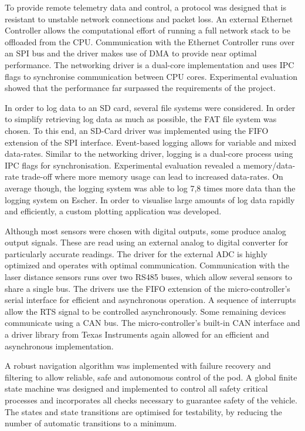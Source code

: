 
To provide remote telemetry data and control, a protocol was designed that is resistant to unstable network connections and packet loss. An external Ethernet Controller allows the computational effort of running a full network stack to be offloaded from the CPU. Communication with the Ethernet Controller runs over an SPI bus and the driver makes use of DMA to provide near optimal performance. The networking driver is a dual-core implementation and uses IPC flags to synchronise communication between CPU cores. Experimental evaluation showed that the performance far surpassed the requirements of the project.


In order to log data to an SD card, several file systems were considered. In order to simplify retrieving log data as much as possible, the FAT file system was chosen. To this end, an SD-Card driver was implemented using the FIFO extension of the SPI interface. Event-based logging allows for variable and mixed data-rates. Similar to the networking driver, logging is a dual-core process using IPC flags for synchronisation. Experimental evaluation revealed a memory/data-rate trade-off where more memory usage can lead to increased data-rates. On average though, the logging system was able to log 7,8 times more data than the logging system on Escher. In order to visualise large amounts of log data rapidly and efficiently, a custom plotting application was developed.


Although most sensors were chosen with digital outputs, some produce analog output signals. These are read using an external analog to digital converter for particularly accurate readings. The driver for the external ADC is highly optimized and operates with optimal communication. Communication with the laser distance sensors runs over two RS485 buses, which allow several sensors to share a single bus. The drivers use the FIFO extension of the micro-controller's serial interface for efficient and asynchronous operation. A sequence of interrupts allow the RTS signal to be controlled asynchronously. Some remaining devices communicate using a CAN bus. The micro-controller's built-in CAN interface and a driver library from Texas Instruments again allowed for an efficient and asynchronous implementation.


A robust navigation algorithm was implemented with failure recovery and filtering to allow reliable, safe and autonomous control of the pod. A global finite state machine was designed and implemented to control all safety critical processes and incorporates all checks necessary to guarantee safety of the vehicle. The states and state transitions are optimised for testability, by reducing the number of automatic transitions to a minimum.

